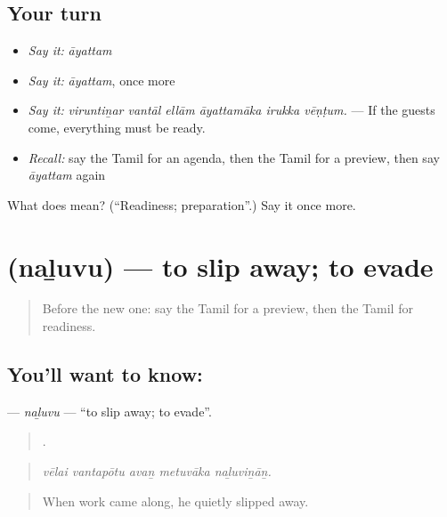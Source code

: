 \subsection*{Your turn}
\begin{itemize}
\raggedright
  \item \emph{Say it:} \emph{āyattam}
  \item \emph{Say it:} \emph{āyattam}, once more
  \item \emph{Say it:} \emph{viruntiṉar vantāl ellām āyattamāka irukka vēṇṭum.} — If the guests come, everything must be ready.
  \item \emph{Recall:} say the Tamil for an agenda, then the Tamil for a preview, then say \emph{āyattam} again
\end{itemize}

\begin{tcolorbox}[breakable,colback=teal!4,colframe=teal!35!black,title={Before you move on}]
What does  mean? (\textquotedblleft{}Readiness; preparation\textquotedblright{}.) Say it once more.
\end{tcolorbox}
\section[\texorpdfstring{\ta{நழுவு} (naḻuvu)}{நழுவு (naḻuvu)}]{ (naḻuvu) — to slip away; to evade}

\label{lesson:TA-C549-naluvu}



\begin{quote}
Before the new one: say the Tamil for a preview, then the Tamil for readiness.
\end{quote}

\subsection*{You'll want to know: }
\textbf{} — \emph{naḻuvu} — \textquotedblleft{}to slip away; to evade\textquotedblright{}.

\begin{quote}
    .
\end{quote}

\begin{quote}
\emph{vēlai vantapōtu avaṉ metuvāka naḻuviṉāṉ.}
\end{quote}

\begin{quote}
When work came along, he quietly slipped away.
\end{quote}

